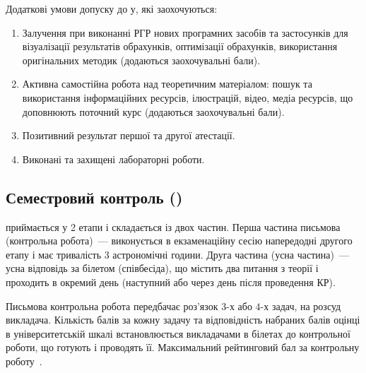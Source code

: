 \documentclass{Syllabus}
\begin{document}
Додаткові умови допуску до \control у, які заохочуються:
\begin{enumerate}[label=$\bullet$]
    \item Залучення при виконанні РГР нових програмних засобів та застосунків для візуалізації результатів обрахунків, оптимізації обрахунків, використання оригінальних методик (додаються заохочувальні бали).
    \item Активна самостійна робота над теоретичним матеріалом: пошук та використання інформаційних ресурсів, ілюстрацій, відео, медіа ресурсів, що доповнюють поточний курс (додаються заохочувальні бали).
    \item Позитивний результат першої та другої атестації.
    \item Виконані та захищені лабораторні роботи.
\end{enumerate}


\subsection*{Семестровий контроль (\control)}

\pgfmathsetmacro{\controlBal}{\controlBalPysm + \controlBalUsno}

\Control{} приймається у 2 етапи і складається із двох частин. Перша частина письмова (контрольна робота)~--- виконується в екзаменаційну сесію напередодні другого етапу і має тривалість $3$ астрономічні години. Друга частина (усна частина)~--- усна відповідь за білетом (співбесіда), що містить два питання з теорії і проходить в окремий день (наступний або через день після проведення КР).

Письмова контрольна робота передбачає роз'язок $3$-х або $4$-х задач, на розсуд викладача. Кількість балів за кожну задачу та відповідність набраних балів оцінці в університетській шкалі встановлюється викладачами в білетах до контрольної роботи, що готують і проводять її. Максимальний рейтинговий бал за контрольну роботу~\controlBalPysm.
\end{document}
